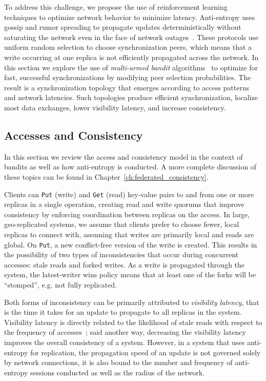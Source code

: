 To address this challenge, we propose the use of reinforcement learning techniques to optimize network behavior to minimize latency.
Anti-entropy uses gossip and rumor spreading to propagate updates
deterministically without saturating the
network even in the face of network
outages~\cite{gossip_protocols,rumor_spreading,rumor_spreading_dynamics}.
These protocols use uniform random selection to choose synchronization peers,
which means that a write occurring at one replica is not efficiently
propagated across the network.
In this section we explore the use of \textit{multi-armed bandit}
algorithms~\cite{epoch_greedy_mab,contextual_bandits} to optimize
for fast, successful synchronizations by modifying peer selection
probabilities.
The result is a synchronization topology that emerges according to access
patterns and network latencies.
Such topologies produce efficient synchronization,
localize most data exchanges, lower visibility latency, and increase
consistency.

\subsection{Accesses and Consistency}

In this section we review the access and consistency model in the context of bandits as well as how anti-entropy is conducted.
A more complete discussion of these topics can be found in Chapter~\ref{ch:federated_consistency}.

Clients can \texttt{Put} (write) and \texttt{Get} (read) key-value pairs to
and from one or more replicas in a single operation, creating read and write quorums that improve consistency by enforcing coordination between replicas on the access.
In large, geo-replicated systems, we assume that clients prefer to choose fewer, local replicas to connect with, assuming that writes are primarily local and reads are global.
On \texttt{Put}, a new conflict-free version of the write is created.
This results in the possibility of two types of inconsistencies that occur during concurrent accesses: stale reads and forked writes.
As a write is propagated through the system, the latest-writer wins policy means that at least one of the forks will be ``stomped'', e.g. not fully replicated.

Both forms of inconsistency can be primarily attributed to \emph{visibility
latency}, that is the time it takes for an update to propagate to all
replicas in the system.
Visibility latency is directly related to the likelihood of stale reads with
respect to the frequency of accesses~\cite{quantifying_pbs}; said
another way, decreasing the visibility latency improves the overall
consistency of a system.
However, in a system that uses anti-entropy for replication, the propagation
speed of an update is not governed solely by network connections, it is also
bound to the number and frequency of anti-entropy sessions conducted as well
as the radius of the network.

